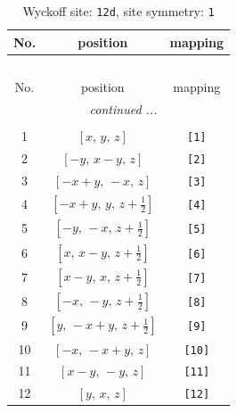 \documentclass[fleqn,8pt]{jsarticle}
\begin{document}
\begin{longtable}{ccc}
\caption{Wyckoff site: {\tt 12d}, site symmetry: {\tt 1}}
 \\
 \hline \hline
No. & position & mapping \\ \hline \endfirsthead

\multicolumn{2}{l}{\tablename\ \thetable{}} \\
 \hline \hline
No. & position & mapping \\ \hline \endhead

 \hline \hline
\multicolumn{2}{r}{\footnotesize\it continued ...} \\ \endfoot

 \hline \hline
\multicolumn{2}{r}{} \\ \endlastfoot

1 & $\left[ x,\, y,\, z \right]$ & {\tt [1]} \\ \hline
2 & $\left[ - y,\, x - y,\, z \right]$ & {\tt [2]} \\ \hline
3 & $\left[ - x + y,\, - x,\, z \right]$ & {\tt [3]} \\ \hline
4 & $\left[ - x + y,\, y,\, z + \frac{1}{2} \right]$ & {\tt [4]} \\ \hline
5 & $\left[ - y,\, - x,\, z + \frac{1}{2} \right]$ & {\tt [5]} \\ \hline
6 & $\left[ x,\, x - y,\, z + \frac{1}{2} \right]$ & {\tt [6]} \\ \hline
7 & $\left[ x - y,\, x,\, z + \frac{1}{2} \right]$ & {\tt [7]} \\ \hline
8 & $\left[ - x,\, - y,\, z + \frac{1}{2} \right]$ & {\tt [8]} \\ \hline
9 & $\left[ y,\, - x + y,\, z + \frac{1}{2} \right]$ & {\tt [9]} \\ \hline
10 & $\left[ - x,\, - x + y,\, z \right]$ & {\tt [10]} \\ \hline
11 & $\left[ x - y,\, - y,\, z \right]$ & {\tt [11]} \\ \hline
12 & $\left[ y,\, x,\, z \right]$ & {\tt [12]} \\
\end{longtable}
\end{document}
